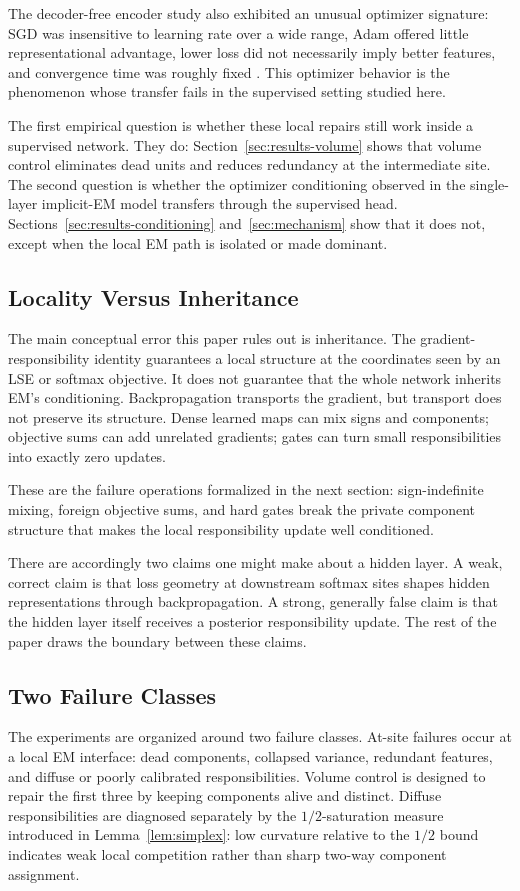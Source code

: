 The decoder-free encoder study also exhibited an unusual optimizer signature:
SGD was insensitive to learning rate over a wide range, Adam offered little
representational advantage, lower loss did not necessarily imply better
features, and convergence time was roughly fixed
\citep{oursland2026decoderfree}. This optimizer behavior is the phenomenon
whose transfer fails in the supervised setting studied here.

The first empirical question is whether these local repairs still work inside
a supervised network. They do: Section~\ref{sec:results-volume} shows that
volume control eliminates dead units and reduces redundancy at the
intermediate site. The second question is whether the optimizer conditioning
observed in the single-layer implicit-EM model transfers through the
supervised head. Sections~\ref{sec:results-conditioning}
and~\ref{sec:mechanism} show that it does not, except when the local EM path
is isolated or made dominant.

\subsection{Locality Versus Inheritance}
The main conceptual error this paper rules out is inheritance. The
gradient-responsibility identity guarantees a local structure at the
coordinates seen by an LSE or softmax objective. It does not guarantee that
the whole network inherits EM's conditioning. Backpropagation transports the
gradient, but transport does not preserve its structure. Dense learned maps
can mix signs and components; objective sums can add unrelated gradients;
gates can turn small responsibilities into exactly zero updates.

These are the failure operations formalized in the next section:
sign-indefinite mixing, foreign objective sums, and hard gates break the
private component structure that makes the local responsibility update well
conditioned.

There are accordingly two claims one might make about a hidden layer. A weak,
correct claim is that loss geometry at downstream softmax sites shapes hidden
representations through backpropagation. A strong, generally false claim is
that the hidden layer itself receives a posterior responsibility update. The
rest of the paper draws the boundary between these claims.

\subsection{Two Failure Classes}
The experiments are organized around two failure classes. At-site failures
occur at a local EM interface: dead components, collapsed variance, redundant
features, and diffuse or poorly calibrated responsibilities. Volume control is
designed to repair the first three by keeping components alive and distinct.
Diffuse responsibilities are diagnosed separately by the $1/2$-saturation
measure introduced in Lemma~\ref{lem:simplex}: low curvature relative to the
$1/2$ bound indicates weak local competition rather than sharp two-way
component assignment.

